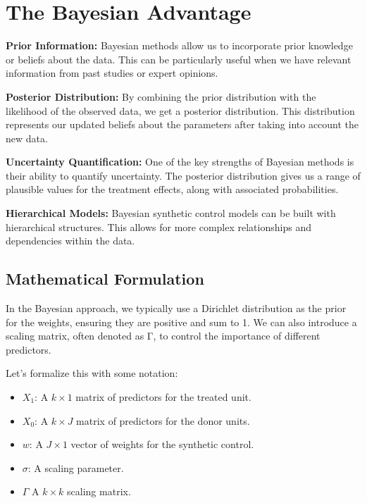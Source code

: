 \documentclass[
  letterpaper,
  DIV=11,
  numbers=noendperiod]{scrreprt}
\providecommand{\tightlist}{%
  \setlength{\itemsep}{0pt}\setlength{\parskip}{0pt}}\usepackage{longtable,booktabs,array}
\begin{document}
\section{The Bayesian Advantage}\label{the-bayesian-advantage}

\textbf{Prior Information:} Bayesian methods allow us to incorporate
prior knowledge or beliefs about the data. This can be particularly
useful when we have relevant information from past studies or expert
opinions.

\textbf{Posterior Distribution:} By combining the prior distribution
with the likelihood of the observed data, we get a posterior
distribution. This distribution represents our updated beliefs about the
parameters after taking into account the new data.

\textbf{Uncertainty Quantification:} One of the key strengths of
Bayesian methods is their ability to quantify uncertainty. The posterior
distribution gives us a range of plausible values for the treatment
effects, along with associated probabilities.

\textbf{Hierarchical Models:} Bayesian synthetic control models can be
built with hierarchical structures. This allows for more complex
relationships and dependencies within the data.

\subsection{Mathematical Formulation}\label{mathematical-formulation}

In the Bayesian approach, we typically use a Dirichlet distribution as
the prior for the weights, ensuring they are positive and sum to 1. We
can also introduce a scaling matrix, often denoted as Γ, to control the
importance of different predictors.

Let's formalize this with some notation:

\begin{itemize}
\tightlist
\item
  \(X_1\): A \(k \times 1\) matrix of predictors for the treated unit.
\item
  \(X_0\): A \(k \times J\) matrix of predictors for the donor units.
\item
  \(w\): A \(J\times 1\) vector of weights for the synthetic control.
\item
  \(\sigma\): A scaling parameter.
\item
  \(\Gamma\) A \(k \times k\) scaling matrix.
\end{itemize}
\end{document}
